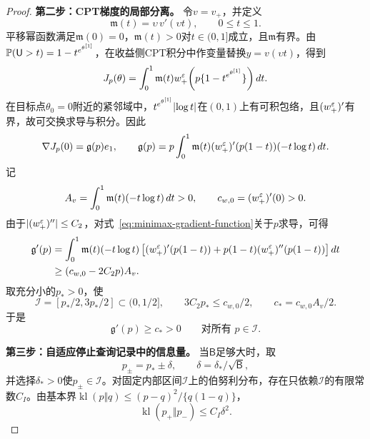 \begin{proof}
\par\smallskip\noindent\textbf{第二步：CPT梯度的局部分离。}\quad
令$v=v_+$，并定义
\[
 \mathfrak m(t)=\upsilon\,v'(\upsilon t),\qquad 0\le t\le1.
\]
平移幂函数满足$\mathfrak m(0)=0$，$\mathfrak m(t)>0$对$t\in(0,1]$成立，且$\mathfrak m$有界。由$\mathbb P(\mathsf U>t)=1-t^{e^{\theta^{[1]}}}$，在收益侧CPT积分中作变量替换$y=v(\upsilon t)$，得到
\begin{equation}\label{eq:minimax-cpt-submodel}
 J_p(\theta)
 =\int_0^1 \mathfrak m(t)
 w_+^\varepsilon\!\left(p\{1-t^{e^{\theta^{[1]}}}\}\right)dt.
\end{equation}
在目标点$\theta_0=0$附近的紧邻域中，$t^{e^{\theta^{[1]}}}\lvert\log t\rvert$在$(0,1)$上有可积包络，且$(w_+^\varepsilon)'$有界，故可交换求导与积分。因此
\begin{equation}\label{eq:minimax-gradient-function}
 \nabla J_p(0)=\mathfrak g(p)e_1,
 \qquad
 \mathfrak g(p)
 =p\int_0^1\mathfrak m(t)(w_+^\varepsilon)'(p(1-t))(-t\log t)\,dt.
\end{equation}
记
\[
 A_v=\int_0^1\mathfrak m(t)(-t\log t)\,dt>0,
 \qquad
 c_{w,0}=(w_+^\varepsilon)'(0)>0.
\]
由于$\lvert(w_+^\varepsilon)''\rvert\le C_2$，对式~\eqref{eq:minimax-gradient-function}关于$p$求导，可得
\begin{align*}
 \mathfrak g'(p)
 &=\int_0^1\mathfrak m(t)(-t\log t)
 \left[(w_+^\varepsilon)'(p(1-t))+p(1-t)(w_+^\varepsilon)''(p(1-t))\right]dt\\
 &\ge (c_{w,0}-2C_2p)A_v.
\end{align*}
取充分小的$p_*>0$，使
\[
 \mathcal I=[p_*/2,3p_*/2]\subset(0,1/2],
 \qquad
 3C_2p_*\le c_{w,0}/2,
 \qquad
 c_*=c_{w,0}A_v/2.
\]
于是
\begin{equation}\label{eq:minimax-gradient-separation}
 \mathfrak g'(p)\ge c_*>0
 \qquad\text{对所有 }p\in\mathcal I.
\end{equation}

\par\smallskip\noindent\textbf{第三步：自适应停止查询记录中的信息量。}\quad
当$\mathsf B$足够大时，取
\[
 p_\pm=p_*\pm\delta,
 \qquad
 \delta=\delta_*/\sqrt{\mathsf B},
\]
并选择$\delta_*>0$使$p_\pm\in\mathcal I$。对固定内部区间$\mathcal I$上的伯努利分布，存在只依赖$\mathcal I$的有限常数$C_I$。由基本界$\operatorname{kl}(p\Vert q)\le (p-q)^2/\{q(1-q)\}$，
\begin{equation}\label{eq:bernoulli-kl-bound}
 \operatorname{kl}(p_+\Vert p_-)
 \le C_I\delta^2.
\end{equation}


\end{proof}
